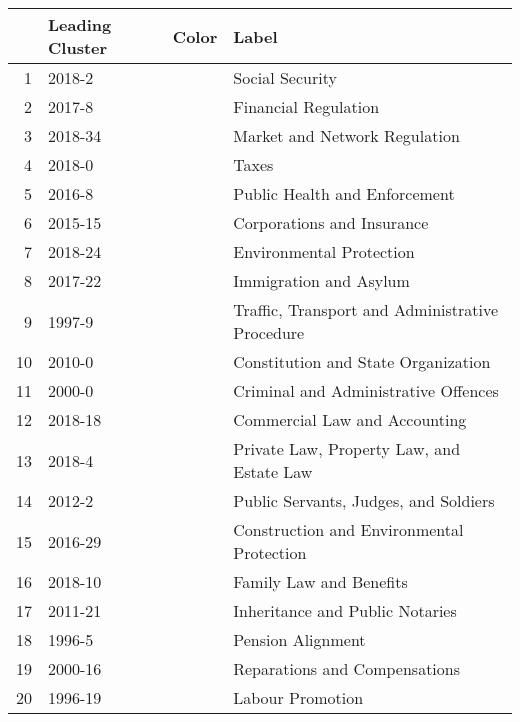 \bgroup
\def\arraystretch{1.5}
\begin{tabular}{r|p{}cp{}}
	&\textbf{Leading Cluster}&\textbf{Color}&\textbf{Label}\\\hline
	1&2018-2&\colorbox{tab1}{\makebox[2em]{\strut}}&Social Security\\
	2&2017-8&\colorbox{tab3}{\makebox[2em]{\strut}}&Financial Regulation\\
	3&2018-34&\colorbox{tab5}{\makebox[2em]{\strut}}&Market and Network Regulation\\
	4&2018-0&\colorbox{tab2}{\makebox[2em]{\strut}}&Taxes\\
	5&2016-8&\colorbox{tab9}{\makebox[2em]{\strut}}&Public Health and Enforcement\\
	6&2015-15&\colorbox{tab13}{\makebox[2em]{\strut}}&Corporations and Insurance\\
	7&2018-24&\colorbox{tab11}{\makebox[2em]{\strut}}&Environmental Protection\\
	8&2017-22&\colorbox{tab14}{\makebox[2em]{\strut}}&Immigration and Asylum\\
	9&1997-9&\colorbox{tab16}{\makebox[2em]{\strut}}&Traffic, Transport and Administrative Procedure\\
	10&2010-0&\colorbox{tab10}{\makebox[2em]{\strut}}&Constitution and State Organization\\
	11&2000-0&\colorbox{tab3}{\makebox[2em]{\strut}}&Criminal and Administrative Offences\\
	12&2018-18&\colorbox{tab7}{\makebox[2em]{\strut}}&Commercial Law and Accounting\\
	13&2018-4&\colorbox{tab6}{\makebox[2em]{\strut}}&Private Law, Property Law, and Estate Law\\
	14&2012-2&\colorbox{tab8}{\makebox[2em]{\strut}}&Public Servants, Judges, and Soldiers\\
	15&2016-29&\colorbox{tab15}{\makebox[2em]{\strut}}&Construction and Environmental Protection\\
	16&2018-10&\colorbox{tab12}{\makebox[2em]{\strut}}&Family Law and Benefits\\
	17&2011-21&\colorbox{tab19}{\makebox[2em]{\strut}}&Inheritance and Public Notaries\\
	18&1996-5&\colorbox{tab17}{\makebox[2em]{\strut}}&Pension Alignment\\
	19&2000-16&\colorbox{tab20}{\makebox[2em]{\strut}}&Reparations and Compensations\\
	20&1996-19&\colorbox{tab18}{\makebox[2em]{\strut}}&Labour Promotion\\
\end{tabular}
\egroup